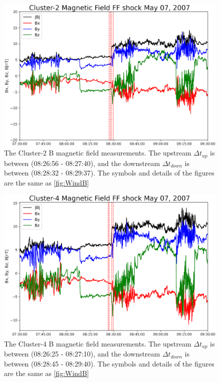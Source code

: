 \documentclass[draft]{agujournal2019}
\begin{document}
\pagebreak

\begin{figure}[!t]
\centering
\includegraphics[width=1\textwidth]{jgr-2023-ipshocks-f13.eps}
\caption{The Cluster-2 B magnetic field measurements. The upstream $\Delta t_{up}$ is between (08:26:56 - 08:27:40), and the downstream $\Delta t_{down}$ is between (08:28:32 - 08:29:37). The symbols and details of the figures are the same as \ref{fig:WindB}}
\label{fig:cl2b}
\end{figure}

\pagebreak

\begin{figure}[!t]
\centering
\includegraphics[width=1.\textwidth]{jgr-2023-ipshocks-f14.eps}
\caption{The Cluster-4 B magnetic field measurements. The upstream $\Delta t_{up}$ is between (08:26:25 - 08:27:10), and the downstream $\Delta t_{down}$ is between (08:28:45 - 08:29:40). The symbols and details of the figures are the same as \ref{fig:WindB}}
\label{fig:cl4b}
\end{figure}
\end{document}
